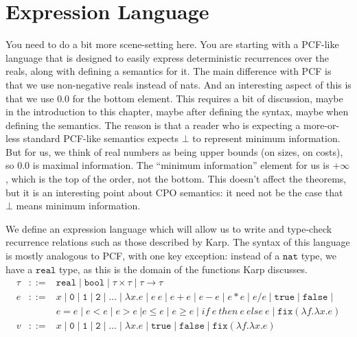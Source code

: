 \section{Expression Language}
\begin{ndBlockComment}
You need to do a bit more scene-setting here.  You are starting
with a PCF-like language that is designed to easily express deterministic
recurrences over the reals, along with defining a semantics for it.  The
main difference with PCF is that we use non-negative reals instead of
nats.  And an interesting aspect of this is that we use $0.0$ for the
bottom element.  This requires a bit of discussion, maybe in the introduction
to this chapter, maybe after defining the syntax, maybe when defining the
semantics.  The reason is that a reader who is expecting a more-or-less
standard PCF-like semantics expects $\bot$ to represent minimum information.
But for us, we think of real numbers as being upper bounds (on sizes, on
costs), so $0.0$ is maximal information.  The ``minimum information''
element for us is $+\infty$, which is the top of the order, not the bottom.
This doesn't affect the theorems, but it is an interesting point about 
CPO semantics:  it need not be the case that $\bot$ means minimum information.
\end{ndBlockComment}





We define an expression language which will allow us to write and type-check recurrence relations such as 
those described by Karp. The syntax of this language is mostly analogous to PCF, with one key exception: instead of a 
$\texttt{nat}$ type, we have a $\texttt{real}$ type, as this is the domain of the functions Karp discusses. 
\[
\begin{array}{rcl}
\tau &::=& \texttt{real} \mid \texttt{bool} \mid \tau \times \tau \mid \tau \rightarrow \tau \\
e &::=& x  \mid \texttt{0} \mid \texttt{1} \mid \texttt{2} \mid \dotsc \mid \lambda x.e \mid e \ e \mid e + e \mid e - e \mid  e  *  e \mid e / e \mid \texttt{true} \mid \texttt{false} \mid \\
  && e  =  e \mid e < e \mid e > e \ | e \leq e \mid e \geq e \mid 
     if \ e \ then \ e \ else \ e \mid \texttt{fix} (\lambda f.\lambda x.e) \\
v &::=& x  \mid \texttt{0} \mid \texttt{1} \mid \texttt{2} \mid \dotsc \mid \lambda x.e \mid \texttt{true} \mid \texttt{false} \mid \texttt{fix} (\lambda f.\lambda x.e)
\end{array}
\]

